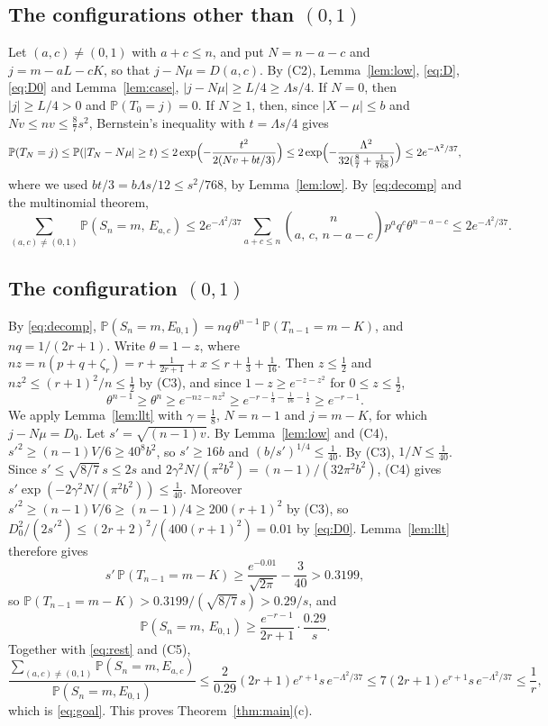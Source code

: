 \documentclass[11pt]{amsart}
\numberwithin{equation}{section}
\newcommand{\Pp}{\mathbb P}
\begin{document}
\subsection*{The configurations other than \texorpdfstring{$(0,1)$}{(0,1)}}
Let $(a,c)\ne(0,1)$ with $a+c\le n$, and put $N=n-a-c$ and $j=m-aL-cK$, so that $j-N\mu=D(a,c)$. By (C2), Lemma~\ref{lem:low}, \eqref{eq:D}, \eqref{eq:D0} and Lemma~\ref{lem:case}, $|j-N\mu|\ge L/4\ge\Lambda s/4$. If $N=0$, then $|j|\ge L/4>0$ and $\Pp(T_0=j)=0$. If $N\ge1$, then, since $|X-\mu|\le b$ and $Nv\le nv\le\frac87s^2$, Bernstein's inequality \cite{Ben62} with $t=\Lambda s/4$ gives
\[
\Pp(T_N=j)\le\Pp(|T_N-N\mu|\ge t)\le2\exp\Bigl(-\frac{t^2}{2(Nv+bt/3)}\Bigr)\le2\exp\Bigl(-\frac{\Lambda^2}{32(\frac87+\frac1{768})}\Bigr)\le2e^{-\Lambda^2/37},
\]
where we used $bt/3=b\Lambda s/12\le s^2/768$, by Lemma~\ref{lem:low}. By \eqref{eq:decomp} and the multinomial theorem,
\begin{equation}\label{eq:rest}
\sum_{(a,c)\ne(0,1)}\Pp(S_n=m,\,E_{a,c})\le2e^{-\Lambda^2/37}\sum_{a+c\le n}\binom{n}{a,\,c,\,n-a-c}p^aq^c\theta^{n-a-c}\le2e^{-\Lambda^2/37}.
\end{equation}

\subsection*{The configuration \texorpdfstring{$(0,1)$}{(0,1)}}
By \eqref{eq:decomp}, $\Pp(S_n=m,E_{0,1})=nq\,\theta^{n-1}\,\Pp(T_{n-1}=m-K)$, and $nq=1/(2r+1)$. Write $\theta=1-z$, where $nz=n(p+q+\zeta_r)=r+\frac1{2r+1}+x\le r+\frac13+\frac1{16}$. Then $z\le\frac12$ and $nz^2\le(r+1)^2/n\le\frac12$ by (C3), and since $1-z\ge e^{-z-z^2}$ for $0\le z\le\frac12$,
\[
\theta^{n-1}\ge\theta^n\ge e^{-nz-nz^2}\ge e^{-r-\frac13-\frac1{16}-\frac12}\ge e^{-r-1}.
\]
We apply Lemma~\ref{lem:llt} with $\gamma=\frac18$, $N=n-1$ and $j=m-K$, for which $j-N\mu=D_0$. Let $s'=\sqrt{(n-1)v}$. By Lemma~\ref{lem:low} and (C4), $s'^2\ge(n-1)V/6\ge40^8b^2$, so $s'\ge16b$ and $(b/s')^{1/4}\le\frac1{40}$. By (C3), $1/N\le\frac1{40}$. Since $s'\le\sqrt{8/7}\,s\le2s$ and $2\gamma^2N/(\pi^2b^2)=(n-1)/(32\pi^2b^2)$, (C4) gives $s'\exp(-2\gamma^2N/(\pi^2b^2))\le\frac1{40}$. Moreover $s'^2\ge(n-1)V/6\ge(n-1)/4\ge200(r+1)^2$ by (C3), so $D_0^2/(2s'^2)\le(2r+2)^2/(400(r+1)^2)=0.01$ by \eqref{eq:D0}. Lemma~\ref{lem:llt} therefore gives
\[
s'\,\Pp(T_{n-1}=m-K)\ge\frac{e^{-0.01}}{\sqrt{2\pi}}-\frac3{40}>0.3199,
\]
so $\Pp(T_{n-1}=m-K)>0.3199/(\sqrt{8/7}\,s)>0.29/s$, and
\[
\Pp(S_n=m,\,E_{0,1})\ge\frac{e^{-r-1}}{2r+1}\cdot\frac{0.29}{s}.
\]
Together with \eqref{eq:rest} and (C5),
\[
\frac{\sum_{(a,c)\ne(0,1)}\Pp(S_n=m,E_{a,c})}{\Pp(S_n=m,E_{0,1})}\le\frac{2}{0.29}(2r+1)e^{r+1}s\,e^{-\Lambda^2/37}\le7(2r+1)e^{r+1}s\,e^{-\Lambda^2/37}\le\frac1r,
\]
which is \eqref{eq:goal}. This proves Theorem~\ref{thm:main}(c).
\end{document}

